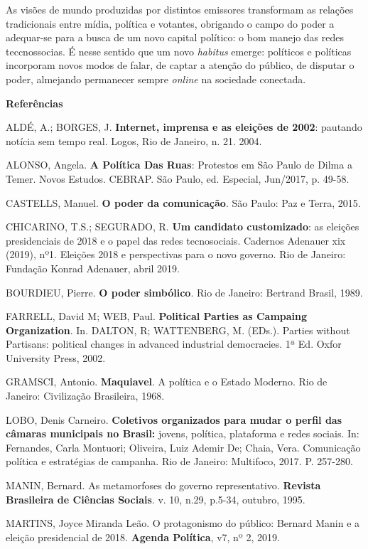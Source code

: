As visões de mundo produzidas por distintos emissores transformam as
relações tradicionais entre mídia, política e votantes, obrigando o
campo do poder a adequar-se para a busca de um novo capital político: o
bom manejo das redes teccnossocias. É nesse sentido que um novo
\emph{habitus} emerge: políticos e políticas incorporam novos modos de
falar, de captar a atenção do público, de disputar o poder, almejando
permanecer sempre \emph{online} na sociedade conectada.

\textbf{Referências}

ALDÉ, A.; BORGES, J. \textbf{Internet, imprensa e as eleições de 2002}:
pautando notícia sem tempo real. Logos, Rio de Janeiro, n. 21. 2004.

ALONSO, Angela. \textbf{A Política Das Ruas}: Protestos em São Paulo de
Dilma a Temer. Novos Estudos. CEBRAP. São Paulo, ed. Especial, Jun/2017,
p. 49-58.

CASTELLS, Manuel. \textbf{O poder da comunicação}. São Paulo: Paz e
Terra, 2015.

CHICARINO, T.S.; SEGURADO, R. \textbf{Um candidato customizado}: as
eleições presidenciais de 2018 e o papel das redes tecnosociais.
Cadernos Adenauer xix (2019), nº1. Eleições 2018 e perspectivas para o
novo governo. Rio de Janeiro: Fundação Konrad Adenauer, abril 2019.

BOURDIEU, Pierre. \textbf{O poder simbólico}. Rio de Janeiro: Bertrand
Brasil, 1989.

FARRELL, David M; WEB, Paul. \textbf{Political Parties as Campaing
Organization}. In. DALTON, R; WATTENBERG, M. (EDs.). Parties without
Partisans: political changes in advanced industrial democracies. 1ª Ed.
Oxfor University Press, 2002.

GRAMSCI, Antonio. \textbf{Maquiavel}. A política e o Estado Moderno. Rio
de Janeiro: Civilização Brasileira, 1968.

LOBO, Denis Carneiro. \textbf{Coletivos organizados para mudar o perfil
das câmaras municipais no Brasil:} jovens, política, plataforma e redes
sociais. In: Fernandes, Carla Montuori; Oliveira, Luiz Ademir De; Chaia,
Vera. Comunicação política e estratégias de campanha. Rio de Janeiro:
Multifoco, 2017. P. 257-280.

MANIN, Bernard. As metamorfoses do governo representativo.
\textbf{Revista Brasileira de Ciências Sociais}. v. 10, n.29, p.5-34,
outubro, 1995.

MARTINS, Joyce Miranda Leão. O protagonismo do público: Bernard Manin e
a eleição presidencial de 2018. \textbf{Agenda Política}, v7, nº 2,
2019.


